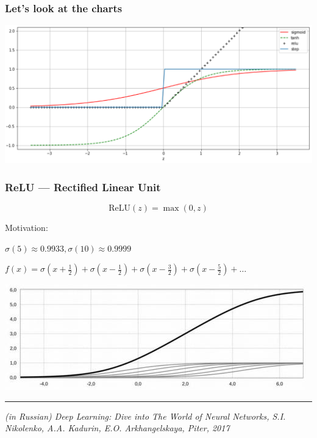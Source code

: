 \documentclass[fullscreen=true, bookmarks=true, hyperref={pdfencoding=unicode}]{beamer}
\begin{document}



\begin{frame}
  \frametitle{Let's look at the charts}
  \begin{center}
    \includegraphics[keepaspectratio, width=0.9\paperwidth]{sigm_relu.png}
  \end{center}
\end{frame}


\begin{frame}
  \frametitle{ReLU — Rectified Linear Unit}
  $$\text{ReLU}(z) = \max(0, z)$$

  Motivation:

  $\sigma(5) \approx 0.9933, \sigma(10) \approx 0.9999$

  $f(x) = \sigma(x + \frac12) + \sigma(x - \frac12) + \sigma(x - \frac32) + \sigma(x - \frac52) + \dots$

  \begin{center}
    \includegraphics[keepaspectratio, width=0.7\paperwidth]{from_nikolenko.jpg}
  \end{center}

  \noindent\rule{8cm}{0.4pt}

  {\it \small (in Russian) Deep Learning: Dive into The World of Neural Networks, S.I. Nikolenko, A.A. Kadurin, E.O. Arkhangelskaya, Piter, 2017}
\end{frame}
\end{document}

